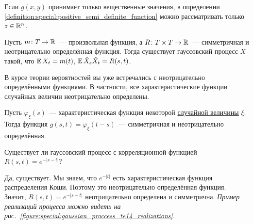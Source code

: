 \begin{remark}
    \label{remark:special:positive_semi_definite_function_for_reals}
    Если $ g(x, y) $ принимает только вещественные значения,
    в определении \ref{definition:special:positive_semi_definite_function} можно рассматривать только $ z \in \mathbb{R}^n $.
\end{remark}

\begin{statement}
    \label{statement:special:mean_and_cov_define_gaussian_process}
    Пусть $ m \colon T \to \mathbb{R} $~--- произвольная функция,
    а $ R \colon T \times T \to \mathbb{R} $~--- симметричная и неотрицательно определённая функция.
    Тогда существует гауссовский процесс $ X $ такой, что $ \operatorname{\mathbb{E}} X_t = m(t) $, $ \operatorname{\mathbb{E}} \mathring{X}_s \mathring{X}_t = R(s, t) $.
\end{statement}

В курсе теории вероятностей вы уже встречались с неотрицательно определёнными функциями.
В частности, все характеристические функции случайных величин неотрицательно определены.

\begin{statement}
    \label{statement:special:characteristic_function_is_positive_semi_definite}
    Пусть $ \varphi_\xi(s) $~--- характеристическая функция некоторой \uline{случайной величины} $ \xi $.
    Тогда функция $ g(s, t) = \varphi_\xi(t - s) $~--- симметричная и неотрицательно определённая.
\end{statement}

\begin{exercise}
    \label{exercise:special:gaussian_from_characteristic_function_of_Cauchy}
    Существует ли гауссовский процесс с корреляционной функцией $ R(s, t) = e^{-|s - t|} $?
\end{exercise}

\begin{solution}
    Да, существует.
    Мы знаем, что $e^{-|t|} $ есть характеристическая функция распределения Коши.
    Поэтому это неотрицательно определённая функция.
    Значит, $ R(s, t) = e^{-|s - t|} $ неотрицательно определена и симметрична.
    \newline
    \textit{Пример реализаций процесса
    можно видеть на рис.~\ref{figure:special:gaussian_proccess_te14_realizations}.}
\end{solution}

